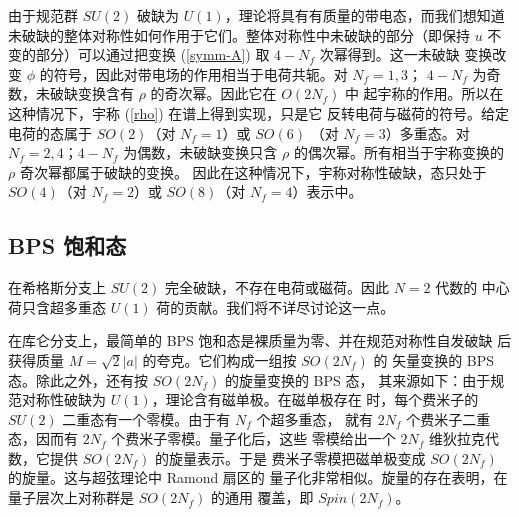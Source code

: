 
由于规范群 $SU(2)$ 破缺为 $U(1)$，理论将具有有质量的带电态，而我们想知道
未破缺的整体对称性如何作用于它们。整体对称性中未破缺的部分（即保持 $u$
不变的部分）可以通过把变换 (\ref{symm-A}) 取 $4-N_f$ 次幂得到。这一未破缺
变换改变 $\phi$ 的符号，因此对带电场的作用相当于电荷共轭。对 $N_f=1,3$；
$4-N_f$ 为奇数，未破缺变换含有 $\rho$ 的奇次幂。因此它在 $O(2N_f)$ 中
起宇称的作用。所以在这种情况下，宇称 (\ref{rho}) 在谱上得到实现，只是它
反转电荷与磁荷的符号。给定电荷的态属于 $SO(2)$（对 $N_f=1$）或 $SO(6)$
（对 $N_f=3$）多重态。对 $N_f=2,4$；$4-N_f$ 为偶数，未破缺变换只含
$\rho$ 的偶次幂。所有相当于宇称变换的 $\rho$ 奇次幂都属于破缺的变换。
因此在这种情况下，宇称对称性破缺，态只处于 $SO(4)$（对 $N_f=2$）或
$SO(8)$（对 $N_f=4$）表示中。

\subsection{BPS 饱和态}

在希格斯分支上 $SU(2)$ 完全破缺，不存在电荷或磁荷。因此 $N=2$ 代数的
中心荷只含超多重态 $U(1)$ 荷的贡献。我们将不详尽讨论这一点。

在库仑分支上，最简单的 BPS 饱和态是裸质量为零、并在规范对称性自发破缺
后获得质量 $M = \sqrt{2} |a|$ 的夸克。它们构成一组按 $SO(2N_f)$ 的
矢量变换的 BPS 态。除此之外，还有按 $SO(2N_f)$ 的旋量变换的 BPS 态，
其来源如下：由于规范对称性破缺为 $U(1)$，理论含有磁单极。在磁单极存在
时，每个费米子的 $SU(2)$ 二重态有一个零模。由于有 $N_f$ 个超多重态，
就有 $2N_f$ 个费米子二重态，因而有 $2N_f$ 个费米子零模。量子化后，这些
零模给出一个 $2N_f$ 维狄拉克代数，它提供 $SO(2N_f)$ 的旋量表示。于是
费米子零模把磁单极变成 $SO(2N_f)$ 的旋量。这与超弦理论中 Ramond 扇区的
量子化非常相似。旋量的存在表明，在量子层次上对称群是 $SO(2N_f)$ 的通用
覆盖，即 $Spin(2N_f)$。


